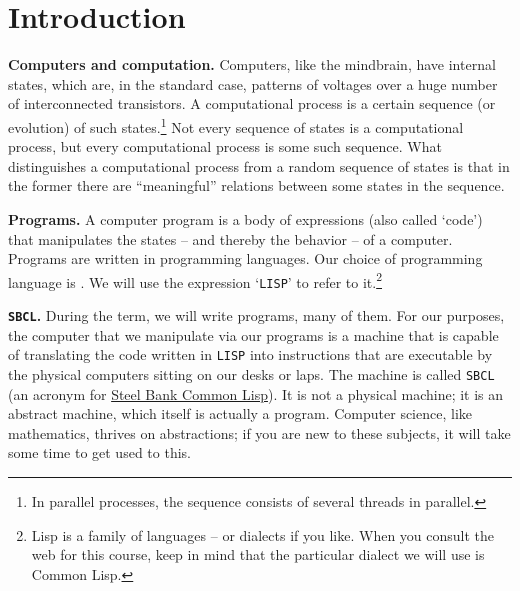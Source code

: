 \documentclass[a4paper,11pt]{article}
\begin{document}

\section{Introduction}

\begin{uenum}
\item
{\bf Computers and computation.}
 Computers, like the mindbrain, have internal states, which are, in the standard case, patterns of voltages over a huge number of interconnected transistors. A computational process is a certain sequence (or evolution) of such states.\footnote{In parallel processes, the sequence consists of several threads in parallel.} Not every sequence of states is a computational process, but every computational process is some such sequence. What distinguishes a computational process from a random sequence of states is that in the former there are ``meaningful'' relations between some states in the sequence. 

\item
{\bf Programs.} A computer program is a body of expressions (also called `code') that manipulates the states -- and thereby the behavior -- of a computer. Programs are written in programming languages. Our choice of programming language is . We will use the expression `\Verb+LISP+' to refer to it.\footnote{Lisp is a family of languages -- or dialects if you like. When you consult the web for this course, keep in mind that the particular dialect we will use is Common Lisp.}

\item {\bf \Verb+SBCL+.} During the term, we will write programs, many of them. For our purposes, the computer that we manipulate via our programs is a machine that is capable of translating the code written in \Verb+LISP+ into instructions that are executable by the physical computers sitting on our desks or laps. The machine is called \Verb+SBCL+ (an acronym for \href{http://www.sbcl.org/}{Steel Bank Common Lisp}). It is not a physical machine; it is an abstract machine, which itself is actually a program. Computer science, like mathematics, thrives on abstractions; if you are new to these subjects, it will take some time to get used to this.%


\end{uenum}
\end{document}
